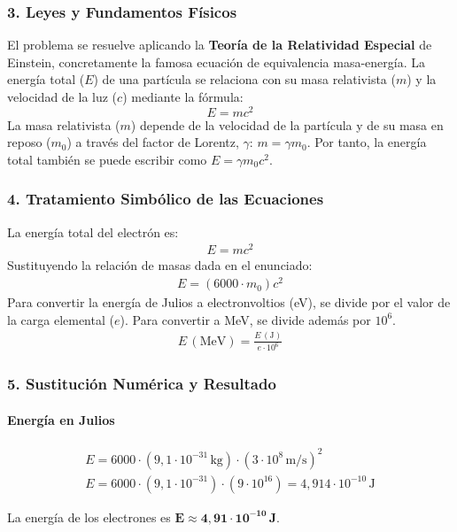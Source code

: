 \subsubsection*{3. Leyes y Fundamentos Físicos}
El problema se resuelve aplicando la \textbf{Teoría de la Relatividad Especial} de Einstein, concretamente la famosa ecuación de equivalencia masa-energía. La energía total ($E$) de una partícula se relaciona con su masa relativista ($m$) y la velocidad de la luz ($c$) mediante la fórmula:
$$ E = m c^2 $$
La masa relativista ($m$) depende de la velocidad de la partícula y de su masa en reposo ($m_0$) a través del factor de Lorentz, $\gamma$: $m = \gamma m_0$. Por tanto, la energía total también se puede escribir como $E = \gamma m_0 c^2$.

\subsubsection*{4. Tratamiento Simbólico de las Ecuaciones}
La energía total del electrón es:
\begin{gather}
    E = m c^2
\end{gather}
Sustituyendo la relación de masas dada en el enunciado:
\begin{gather}
    E = (6000 \cdot m_0) c^2
\end{gather}
Para convertir la energía de Julios a electronvoltios (eV), se divide por el valor de la carga elemental ($e$). Para convertir a MeV, se divide además por $10^6$.
\begin{gather}
    E\,(\text{MeV}) = \frac{E\,(\text{J})}{e \cdot 10^6}
\end{gather}

\subsubsection*{5. Sustitución Numérica y Resultado}
\paragraph{Energía en Julios}
\begin{gather}
    E = 6000 \cdot (9,1 \cdot 10^{-31}\,\text{kg}) \cdot (3 \cdot 10^8\,\text{m/s})^2 \nonumber \\
    E = 6000 \cdot (9,1 \cdot 10^{-31}) \cdot (9 \cdot 10^{16}) = 4,914 \cdot 10^{-10}\,\text{J}
\end{gather}
\begin{cajaresultado}
La energía de los electrones es $\boldsymbol{E \approx 4,91 \cdot 10^{-10}\,\textbf{J}}$.
\end{cajaresultado}

